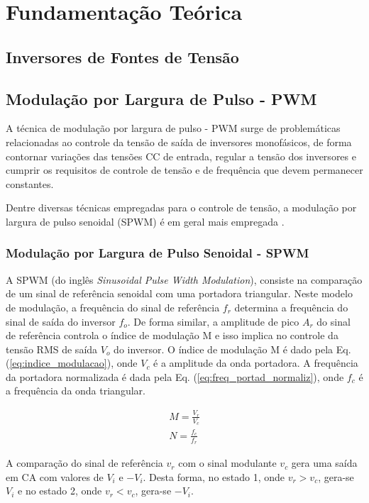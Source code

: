 \chapter{Fundamentação Teórica}

\section{Inversores de Fontes de Tensão}

\section{Modulação por Largura de Pulso - PWM}

A técnica de modulação por largura de pulso - PWM surge de problemáticas relacionadas ao controle da tensão de saída de inversores monofásicos, de forma contornar variações das tensões CC de entrada, regular a tensão dos inversores e cumprir os requisitos de controle de tensão e de frequência que devem permanecer constantes.

Dentre diversas técnicas empregadas para o controle de tensão, a modulação por largura de pulso senoidal (SPWM) é em geral mais empregada \cite{Rashid-Muhammad}.

\subsection{Modulação por Largura de Pulso Senoidal - SPWM}

A SPWM (do inglês \textit{Sinusoidal Pulse Width Modulation}), consiste na comparação de um sinal de referência senoidal com uma portadora triangular. Neste modelo de modulação, a frequência do sinal de referência $f_r$ determina a frequência do sinal de saída do inversor $f_o$. De forma similar, a amplitude de pico $A_r$ do sinal de referência controla o índice de modulação M e isso implica no controle da tensão RMS de saída $V_o$ do inversor. O índice de modulação M é dado pela Eq. (\ref{eq:indice_modulacao}), onde $V_{c}$ é a amplitude da onda portadora. A frequência da portadora normalizada é dada pela Eq. (\ref{eq:freq_portad_normaliz}), onde $f_c$ é a frequência da onda triangular.

\begin{align}
	M = \frac{V_r}{V_{c}} \label{eq:indice_modulacao} \\
	N = \frac{f_c}{f_r} \label{eq:freq_portad_normaliz}	
\end{align}

A comparação do sinal de referência $v_r$ com o sinal modulante $v_c$ gera uma saída em CA com valores de $V_i$ e $-V_i$. Desta forma, no estado 1, onde $v_r > v_c$, gera-se $V_i$ e no estado 2, onde $v_r < v_c$, gera-se $-V_i$. 

